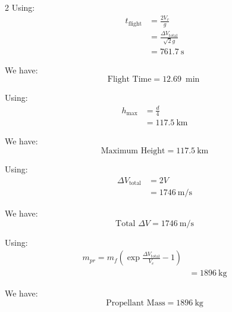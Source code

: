 \begin{hwkProblem*}{2}{}
	Using:
	\begin{align*}
		t_{\text{flight}} &= \frac{2 V_{v}}{g} \\
		\, &= \frac{\Delta V_{\text{total}}}{\sqrt{2} g} \\
		\, &= \qty{761.7}{\s}
	\end{align*}

	We have:
	\[
		\boxed{\text{Flight Time} = \qty{12.69}{\min}}
	\]

	\hwkPart{} \label{hwk:s02c}

	Using:
	\begin{align*}
		h_{\text{max}} &= \frac{d}{4} \\
		\, &= \qty{117.5}{\km}
	\end{align*}

	We have:
	\[
		\boxed{\text{Maximum Height} = \qty{117.5}{\km}}
	\]

	\hwkPart{} \label{hwk:s02d}

	Using:
	\begin{align*}
		\Delta V_{\text{total}} &= 2 V \\
		\, &= \qty{1746}{\m\per\s}
	\end{align*}

	We have:
	\[
		\boxed{\text{Total } \Delta V = \qty{1746}{\m\per\s}}
	\]

	\hwkPart{} \label{hwk:s02e}

	Using:
	\begin{align*}
		m_{pr} = m_{f} \left(\exp{\frac{\Delta V_{\text{total}}}{V_{e}}} - 1\right) \\
		\, &= \qty{1896}{\kg}
	\end{align*}

	We have:
	\[
		\boxed{\text{Propellant Mass} = \qty{1896}{\kg}}
	\]

\end{hwkProblem*}

